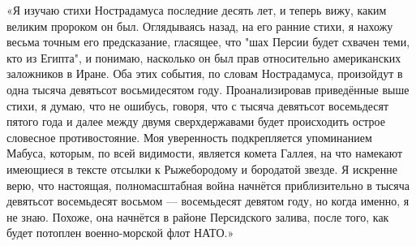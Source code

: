 \documentclass[a4paper,12pt]{book}
\begin{document}
	«Я изучаю стихи Нострадамуса последние десять лет, и теперь вижу, каким великим пророком он был. Оглядываясь назад, на его ранние стихи, я нахожу весьма точным его предсказание, гласящее, что "шах Персии будет схвачен теми, кто из Египта", и понимаю, насколько он был прав относительно американских заложников в Иране. Оба этих события, по словам Нострадамуса, произойдут в одна тысяча девятьсот восьмидесятом году.
	Проанализировав приведённые выше стихи, я думаю, что не ошибусь, говоря, что с тысяча девятьсот восемьдесят пятого года и далее между двумя сверхдержавами будет происходить острое словесное противостояние. Моя уверенность подкрепляется упоминанием Мабуса, которым, по всей видимости, является комета Галлея, на что намекают имеющиеся в тексте отсылки к Рыжебородому и бородатой звезде. Я искренне верю, что настоящая, полномасштабная война начнётся приблизительно в тысяча девятьсот восемьдесят восьмом — восемьдесят девятом году, но когда именно, я не знаю. Похоже, она начнётся в районе Персидского залива, после того, как будет потоплен военно-морской флот НАТО.» 
\end{document}
